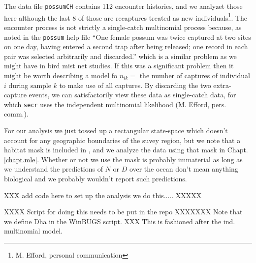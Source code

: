The data file \mbox{\tt possumCH} contains 112 encounter histories,
and we analyzet those here although the last 8 of those are recaptures
treated as new individuals\footnote{M. Efford, personal communication}.
The encounter process is not strictly a single-catch multinomial process because,
as noted in the \mbox{\tt possum} help file
 ``One female possum was twice captured at two
sites on one day, having entered a second trap after being released;
one record in each pair was selected arbitrarily and discarded.''
which is a similar problem as we might have in bird mist net studies.
If this was a significant problem then it might be worth describing a
model fo $n_{ik} = $ the number of captures of individual $i$ during
sample $k$ to make use of all captures. By discarding the two
extra-capture events, we can satisfactorily view these data as
single-catch data, for which \mbox{\tt secr} uses the independent
multinomial likelihood (M. Efford, pers. comm.).

For our analysis we just tossed up a rectangular state-space which
doesn't account for any geographic boundaries of the suvey region, but
we note that a habitat mask is included in \secr, and we analyze the
data using that mask in Chapt. \ref{chapt.mle}.
Whether or not we use the mask is
probably immaterial as long as we understand the predictions of $N$ or
$D$ over the ocean don't mean anything biological and we probably
wouldn't report such predictions.

XXX add code here
to set up the analysis we do this.....
XXXXX

XXXX Script for doing this needs to be put in the repo XXXXXXX
Note that we define Dha in the WinBUGS script.
XXX This is fashioned after the ind. multinomial model.

